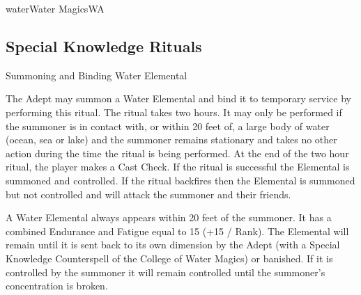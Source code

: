 \begin{college}[1.3]{water}{Water Magics}{WA}
\subsection{Special Knowledge Rituals}

\begin{ritual}[R-1]{Summoning and Binding Water Elemental}

\begin{effects}
The Adept may summon a Water Elemental and bind it to temporary
service by performing this ritual. The ritual takes two hours. It may
only be performed if the summoner is in contact with, or within 20
feet of, a large body of water (ocean, sea or lake) and the summoner
remains stationary and takes no other action during the time the
ritual is being performed. At the end of the two hour ritual, the
player makes a Cast Check. If the ritual is successful the Elemental
is summoned and controlled. If the ritual backfires then the Elemental
is summoned but not controlled and will attack the summoner and their
friends.

A Water Elemental always appears within 20 feet of the summoner. It
has a combined Endurance and Fatigue equal to 15 (+15 / Rank). The
Elemental will remain until it is sent back to its own dimension by
the Adept (with a Special Knowledge Counterspell of the College of
Water Magics) or banished. If it is controlled by the summoner it will
remain controlled until the summoner's concentration is broken.
\end{effects}
\end{ritual}
\end{college}
